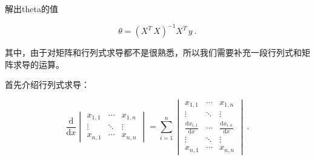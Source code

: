 解出theta的值

\begin{equation}
\theta=\left(X^T\,X\right)^{-1}X^T\,y~.
\end{equation}

其中，由于对矩阵和行列式求导都不是很熟悉，所以我们需要补充一段行列式和矩阵求导的运算。

首先介绍行列式求导：

\begin{equation}
\frac{\mathrm{d}}{\mathrm{d} x}\begin{vmatrix} x_{1,1} & \cdots & x_{1,n} \\ \vdots & \ddots & \vdots \\ x_{n,1} & \cdots & x_{n,n} \end{vmatrix}=\sum_{i=1}^n \begin{vmatrix} x_{1,1} & \cdots & x_{1,n} \\
\vdots & \ddots & \vdots \\ \frac{\mathrm{d} x_{i,1}}{\mathrm{d} x} & \cdots & \frac{\mathrm{d} x_{i,n}}{\mathrm {d} x} \\ \vdots & \ddots & \vdots \\ x_{n,1} & \cdots & x_{n,n} \end{vmatrix}~.
\end{equation}
